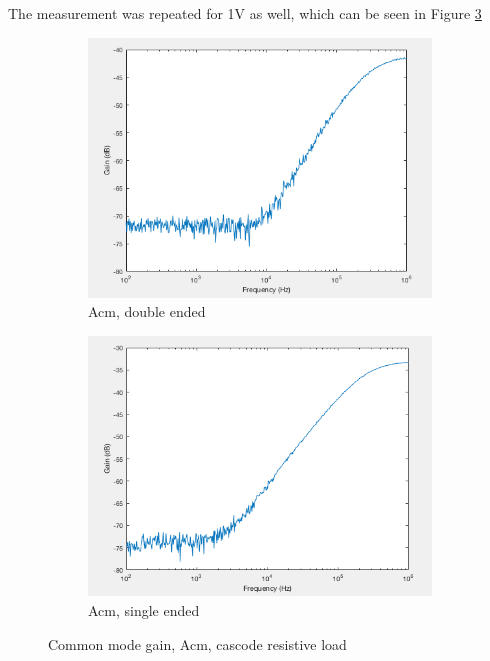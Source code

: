 The measurement was repeated for 1V as well, which can be seen in Figure \ref{fig:resloadAcm1V} 

\begin{figure}[H]
    \centering
    \begin{subfigure}[b]{0.45\textwidth}
        \centering
        \includegraphics[width=\textwidth]{ExperimentalImplementation/Acm_1_double.png}
        \caption{Acm, double ended}
        \label{fig:blue_led}
    \end{subfigure}
    \hfill
    \begin{subfigure}[b]{0.45\textwidth}
        \centering
        \includegraphics[width=\textwidth]{ExperimentalImplementation/Acm_1_single.png}
        \caption{Acm, single ended}
        \label{fig:blue_led}
    \end{subfigure}
    \caption{Common mode gain, Acm, cascode resistive load}
    \label{fig:resloadAcm1V}
\end{figure} 

